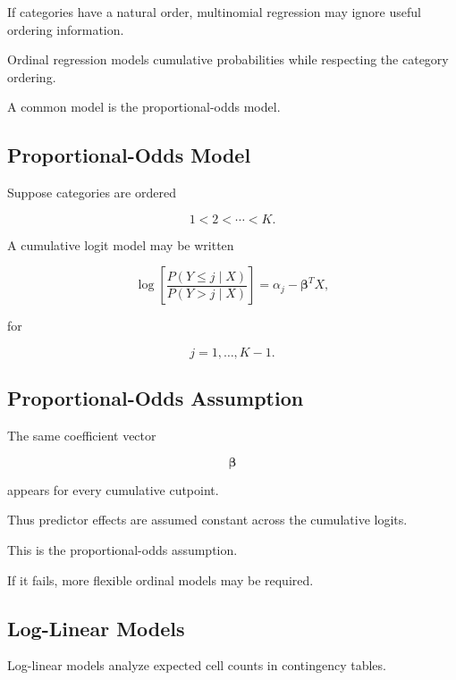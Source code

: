 If categories have a natural order, multinomial regression may ignore
useful ordering information.

Ordinal regression models cumulative probabilities while respecting the
category ordering.

A common model is the proportional-odds model.

\subsection{Proportional-Odds Model}
\label{subsec:proportional-odds-model}

Suppose categories are ordered

\[
1<2<\cdots<K.
\]

A cumulative logit model may be written

\[
\boxed{
\log
\left[
\frac{
P(Y\leq j\mid X)
}{
P(Y>j\mid X)
}
\right]
=
\alpha_j
-
\boldsymbol{\beta}^TX,
}
\]

for

\[
j=1,\ldots,K-1.
\]

\subsection{Proportional-Odds Assumption}
\label{subsec:proportional-odds-assumption}

The same coefficient vector

\[
\boldsymbol{\beta}
\]

appears for every cumulative cutpoint.

Thus predictor effects are assumed constant across the cumulative logits.

This is the proportional-odds assumption.

If it fails, more flexible ordinal models may be required.

\subsection{Log-Linear Models}
\label{subsec:log-linear-models}

Log-linear models analyze expected cell counts in contingency tables.

